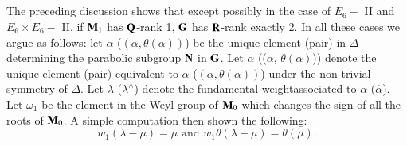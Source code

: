 \subsection{}\label{art9-subsec5.26}
The preceding discussion shows that except possibly in the case of $E_6 -$ II and $E_6 \times E_6 -$ II, if $\mathbf{M}_1$ has $\mathbf{Q}$-rank 1, $\mathbf{G}$ has $\mathbf{R}$-rank exactly 2. In all these cases we argue as follows: let $\alpha$ (\resp $(\alpha, \theta (\alpha))$) be the unique element (\resp pair) in $\Delta$ determining the parabolic subgroup $\mathbf{N}$ in $\mathbf{G}$. Let $\alpha$ (\resp ($\alpha$, $\theta(\alpha)$)) denote the unique element (\resp pair) equivalent to $\alpha$ (\resp $(\alpha, \theta(\alpha))$) under the non-trivial symmetry of $\Delta$. Let $\lambda$ (\resp $\lambda^\wedge$) denote the fundamental weight\pageoriginale associated to $\alpha$ (\resp $\hat{\alpha}$). Let $\omega_1$ be the element in the Weyl group of $\mathbf{M}_0$ which changes the sign of all the roots of $\mathbf{M}_0$. A simple computation then shown the following:
\begin{equation}
w_1 (\lambda - \mu) = \mu \text{ and } w_1\theta (\lambda - \mu) = \theta (\mu). 
\tag{($\ast$)}
\end{equation}
